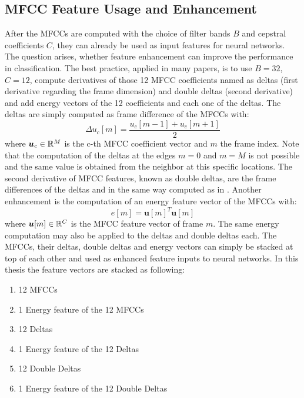 
\subsection{MFCC Feature Usage and Enhancement}\label{sec:signal_mfcc_enhancement}
After the MFCCs are computed with the choice of filter bands $B$ and cepstral coefficients $C$, they can already be used as input features for neural networks.
The question arises, whether feature enhancement can improve the performance in classification.
The best practice, applied in many papers, is to use $B=32$, $C=12$, compute derivatives of those 12 MFCC coefficients named as deltas (first derivative regarding the frame dimension) and double deltas (second derivative) and add energy vectors of the 12 coefficients and each one of the deltas.
The deltas are simply computed as frame difference of the MFCCs with:
\begin{equation}\label{eq:signal_mfcc_delta}
  \Delta u_c[m] = \frac{u_c[m - 1] + u_c[m + 1]}{2}
\end{equation}
where $\bm{u}_c \in \mathbb{R}^M$ is the c-th MFCC coefficient vector and $m$ the frame index.
Note that the computation of the deltas at the edges $m=0$ and $m=M$ is not possible and the same value is obtained from the neighbor at this specific locations.
The second derivative of MFCC features, known as double deltas, are the frame differences of the deltas and in the same way computed as in .
Another enhancement is the computation of an energy feature vector of the MFCCs with:
\begin{equation}
  e[m] = \bm{u}[m]^T \bm{u}[m] 
\end{equation}
where $\bm{u}[m] \in \mathbb{R}^C$ is the MFCC feature vector of frame $m$.
The same energy computation may also be applied to the deltas and double deltas each.
The MFCCs, their deltas, double deltas and energy vectors can simply be stacked at top of each other and used as enhanced feature inputs to neural networks.
In this thesis the feature vectors are stacked as following:
\begin{enumerate}
    \item 12 MFCCs
    \item 1 Energy feature of the 12 MFCCs
    \item 12 Deltas
    \item 1 Energy feature of the 12 Deltas
    \item 12 Double Deltas
    \item 1 Energy feature of the 12 Double Deltas
\end{enumerate}
